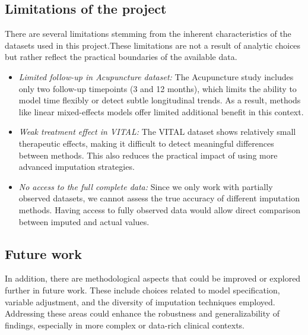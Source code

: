 \documentclass{article}
\begin{document}
\subsection{Limitations of the
project}\label{limitations-of-the-project}

There are several limitations stemming from the inherent characteristics
of the datasets used in this project.These limitations are not a result
of analytic choices but rather reflect the practical boundaries of the
available data.

\begin{itemize}
\item
  \emph{Limited follow-up in Acupuncture dataset:} The Acupuncture study
  includes only two follow-up timepoints (3 and 12 months), which limits
  the ability to model time flexibly or detect subtle longitudinal
  trends. As a result, methods like linear mixed-effects models offer
  limited additional benefit in this context.
\item
  \emph{Weak treatment effect in VITAL:} The VITAL dataset shows
  relatively small therapeutic effects, making it difficult to detect
  meaningful differences between methods. This also reduces the
  practical impact of using more advanced imputation strategies.
\item
  \emph{No access to the full complete data:} Since we only work with
  partially observed datasets, we cannot assess the true accuracy of
  different imputation methods. Having access to fully observed data
  would allow direct comparison between imputed and actual values.
\end{itemize}

\subsection{Future work}\label{future-work}

In addition, there are methodological aspects that could be improved or
explored further in future work. These include choices related to model
specification, variable adjustment, and the diversity of imputation
techniques employed. Addressing these areas could enhance the robustness
and generalizability of findings, especially in more complex or
data-rich clinical contexts.
\end{document}
